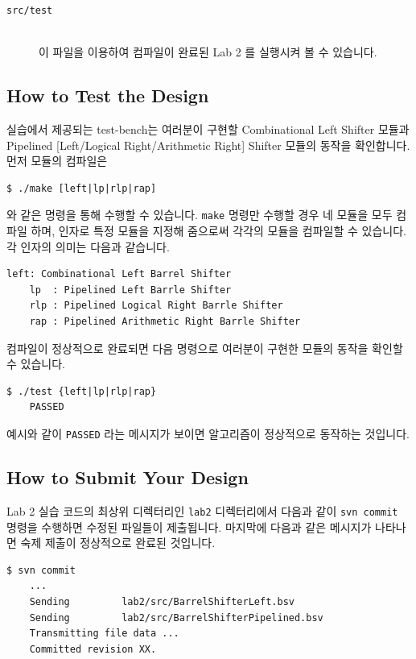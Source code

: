 \documentclass{article}
\begin{document}
\begin{description}
\item [\texttt{src/test}]\hfill \ \\
	이 파일을 이용하여 컴파일이 완료된 Lab 2 를 실행시켜 볼 수 있습니다.

\end{description}

\subsection{How to Test the Design}
실습에서 제공되는 test-bench는 여러분이 구현할 Combinational Left Shifter 모듈과 
Pipelined [Left/Logical Right/Arithmetic Right] Shifter 모듈의 동작을 확인합니다.
먼저 모듈의 컴파일은 

\begin{Verbatim}[frame=single]
    $ ./make [left|lp|rlp|rap]
\end{Verbatim}
와 같은 명령을 통해 수행할 수 있습니다.
\texttt{make} 명령만 수행할 경우 네 모듈을 모두 컴파일 하며,
인자로 특정 모듈을 지정해 줌으로써 각각의 모듈을 컴파일할 수 있습니다.
각 인자의 의미는 다음과 같습니다.

\begin{Verbatim}[frame=single]
    left: Combinational Left Barrel Shifter
    lp  : Pipelined Left Barrle Shifter
    rlp : Pipelined Logical Right Barrle Shifter
    rap : Pipelined Arithmetic Right Barrle Shifter
\end{Verbatim}
컴파일이 정상적으로 완료되면 다음 명령으로 여러분이 구현한 모듈의 동작을 확인할 수 있습니다.

\begin{Verbatim}[frame=single]
    $ ./test {left|lp|rlp|rap}
    PASSED
\end{Verbatim}
예시와 같이 \texttt{PASSED} 라는 메시지가 보이면 알고리즘이 정상적으로 동작하는 것입니다.

\subsection{How to Submit Your Design}
Lab 2 실습 코드의 최상위 디렉터리인 \texttt{lab2} 디렉터리에서
다음과 같이 \texttt{svn commit} 명령을 수행하면 수정된 파일들이 제출됩니다.
마지막에 다음과 같은 메시지가 나타나면 숙제 제출이 정상적으로 완료된 것입니다.

\begin{Verbatim}[frame=single]
    $ svn commit
    ...
    Sending         lab2/src/BarrelShifterLeft.bsv
    Sending         lab2/src/BarrelShifterPipelined.bsv
    Transmitting file data ...
    Committed revision XX.
\end{Verbatim}
\end{document}
